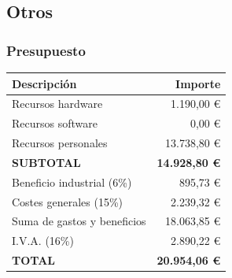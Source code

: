 \documentclass[spanish,notes=hide]{beamer}
\begin{document}
\subsection{Otros}
\frame
{
  \frametitle{Presupuesto}
	\begin{table}
	 \begin{center}
	  \begin{tabular}{|l|r|}
		\hline
		\textbf{Descripción} & \textbf{Importe} \\ 
		\hline
		Recursos hardware & 1.190,00 \euro \\
		\hline
		Recursos software & 0,00 \euro \\
		\hline
		Recursos personales & 13.738,80 \euro \\
		\hline
		\textbf{SUBTOTAL} & \textbf{14.928,80 \euro} \\
		\hline
		Beneficio industrial (6\%) & 895,73 \euro \\
		\hline
		Costes generales (15\%) & 2.239,32 \euro \\
		\hline
		Suma de gastos y beneficios & 18.063,85 \euro \\
		\hline
		I.V.A. (16\%) & 2.890,22 \euro \\
		\hline
		\textbf{TOTAL} & \Large\textbf{20.954,06 \euro} \\
		\hline
	  \end{tabular}
	 \end{center}
	\end{table}
}
\end{document}
